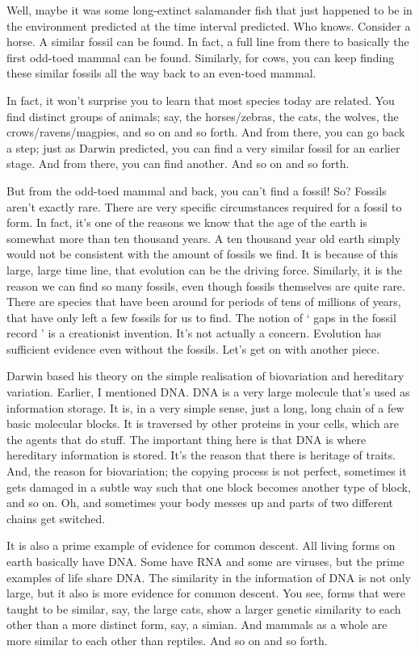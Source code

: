\begin{multicols}{2}
Well, maybe it was some long-extinct salamander fish that just happened to be in the environment predicted at the time interval predicted. Who knows. Consider a horse. A similar fossil can be found. In fact, a full line from there to basically the first odd-toed mammal can be found. Similarly, for cows, you can keep finding these similar fossils all the way back to an even-toed mammal.

In fact, it won't surprise you to learn that most species today are related. You find distinct groups of animals; say, the horses/zebras, the cats, the wolves, the crows/ravens/magpies, and so on and so forth. And from there, you can go back a step; just as Darwin predicted, you can find a very similar fossil for an earlier stage. And from there, you can find another. And so on and so forth.

But from the odd-toed mammal and back, you can't find a fossil! So? Fossils aren't exactly rare. There are very specific circumstances required for a fossil to form. In fact, it's one of the reasons we know that the age of the earth is somewhat more than ten thousand years. A ten thousand year old earth simply would not be consistent with the amount of fossils we find. It is because of this large, large time line, that evolution can be the driving force. Similarly, it is the reason we can find so many fossils, even though fossils themselves are quite rare. There are species that have been around for periods of tens of millions of years, that have only left a few fossils for us to find. The notion of ‘ gaps in the fossil record ’ is a creationist invention. It's not actually a concern. Evolution has sufficient evidence even without the fossils. Let's get on with another piece.

Darwin based his theory on the simple realisation of biovariation and hereditary variation. Earlier, I mentioned DNA. DNA is a very large molecule that's used as information storage. It is, in a very simple sense, just a long, long chain of a few basic molecular blocks. It is traversed by other proteins in your cells, which are the agents that do stuff. The important thing here is that DNA is where hereditary information is stored. It's the reason that there is heritage of traits. And, the reason for biovariation; the copying process is not perfect, sometimes it gets damaged in a subtle way such that one block becomes another type of block, and so on. Oh, and sometimes your body messes up and parts of two different chains get switched.

It is also a prime example of evidence for common descent. All living forms on earth basically have DNA. Some have RNA and some are viruses, but the prime examples of life share DNA. The similarity in the information of DNA is not only large, but it also is more evidence for common descent. You see, forms that were taught to be similar, say, the large cats, show a larger genetic similarity to each other than a more distinct form, say, a simian. And mammals as a whole are more similar to each other than reptiles. And so on and so forth.


\end{multicols}
